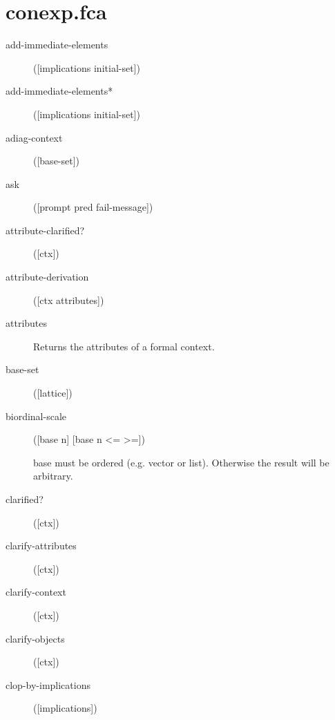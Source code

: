 \section{conexp.fca}
\begin{description}
  \item[add-immediate-elements]
([implications initial-set])



  \item[add-immediate-elements*]
([implications initial-set])



  \item[adiag-context]
([base-set])



  \item[ask]
([prompt pred fail-message])



  \item[attribute-clarified?]
([ctx])



  \item[attribute-derivation]
([ctx attributes])



  \item[attributes]


Returns the attributes of a formal context.

  \item[base-set]
([lattice])



  \item[biordinal-scale]
([base n] [base n <= >=])

base must be ordered (e.g. vector or list). Otherwise the result will be arbitrary.

  \item[clarified?]
([ctx])



  \item[clarify-attributes]
([ctx])



  \item[clarify-context]
([ctx])



  \item[clarify-objects]
([ctx])



  \item[clop-by-implications]
([implications])




\end{description}
